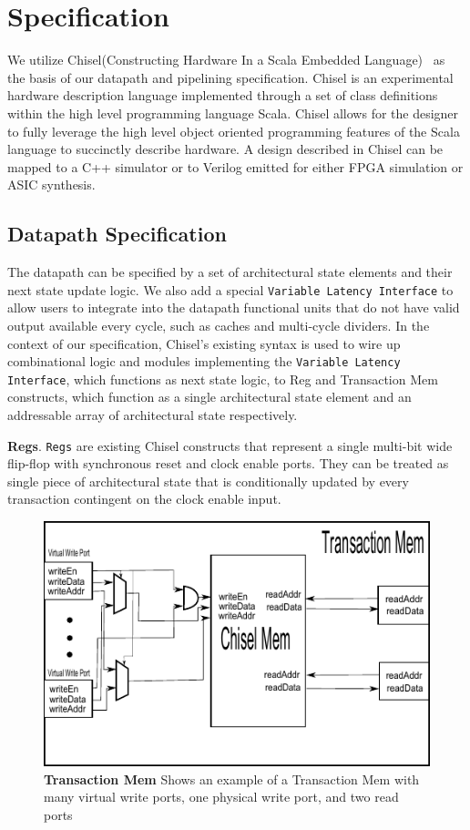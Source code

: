 \section{Specification}
We utilize Chisel(Constructing Hardware In a Scala Embedded
Language)~\cite{Bachrach:2012} as the basis of our datapath and
pipelining specification. Chisel is an experimental hardware
description language implemented through a set of class definitions
within the high level programming language Scala. Chisel allows for
the designer to fully leverage the high level object oriented
programming features of the Scala language to succinctly describe
hardware. A design described in Chisel can be mapped to a C++
simulator or to Verilog emitted for either FPGA simulation or ASIC
synthesis.

\subsection{Datapath Specification}
The datapath can be specified by a set of architectural state elements
and their next state update logic. We also add a special {\tt Variable
Latency Interface} to allow users to integrate into the datapath
functional units that do not have valid output available every cycle,
such as caches and multi-cycle dividers. In the context of our
specification, Chisel's existing syntax is used to wire up
combinational logic and modules implementing the {\tt Variable Latency
Interface}, which functions as next state logic, to Reg and Transaction
Mem constructs, which function as a single architectural state element
and an addressable array of architectural state respectively.

{\bf Regs}. {\tt Regs} are existing Chisel constructs that represent a
single multi-bit wide flip-flop with synchronous reset and clock
enable ports. They can be treated as single piece of architectural
state that is conditionally updated by every transaction contingent on
the clock enable input.

\begin{figure}[htb]
\centering
\includegraphics{figures/TMEM.pdf}
\caption{{\bf Transaction Mem} Shows an example of a Transaction Mem with many virtual write ports, one physical write port, and two read ports}
\label{fig:tmem}
\end{figure}

